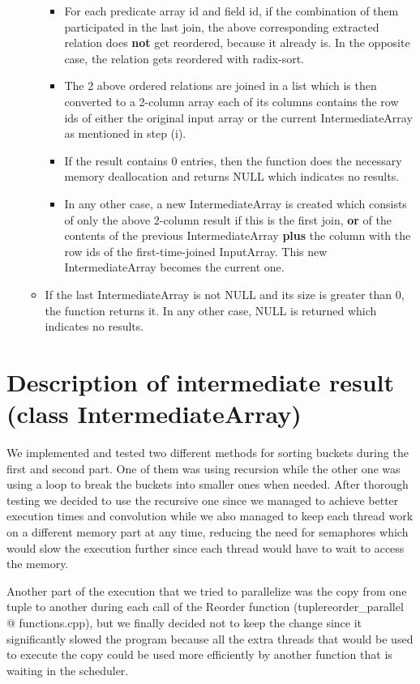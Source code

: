 \documentclass{ws-ijprai}
\begin{document}
\begin{itemize}
\begin{itemize}
\begin{itemize}
            \item For each predicate array id and field id, if the combination of them participated in the last join, the above corresponding extracted relation does \textbf{not} get reordered, because it already is. In the opposite case, the relation gets reordered with radix-sort.
            \item The 2 above ordered relations are joined in a list which is then converted to a 2-column array each of its columns contains the row ids of either the original input array or the current IntermediateArray as mentioned in step (i).
            \item If the result contains 0 entries, then the function does the necessary memory deallocation and returns NULL which indicates no results.
            \item In any other case, a new IntermediateArray is created which consists of only the above 2-column result if this is the first join, \textbf{or} of the contents of the previous IntermediateArray \textbf{plus} the column with the row ids of the first-time-joined InputArray. This new IntermediateArray becomes the current one.
        \end{itemize}
        \item If the last IntermediateArray is not NULL and its size is greater than 0, the function returns it. In any other case, NULL is returned which indicates no results.
    \end{itemize}
\end{itemize}


\section{Description of intermediate result (class IntermediateArray)}

\tab We implemented and tested two different methods for sorting buckets during the first and second part. One of them was using recursion while the other one was using a loop to break the buckets into smaller ones when needed. After thorough testing we decided to use the recursive one since we managed to achieve better execution times and convolution while we also managed to keep each thread work on a different memory part at any time, reducing the need for semaphores which would slow the execution further since each thread would have to wait to access the memory.

\tab Another part of the execution that we tried to parallelize was the copy from one tuple to another during each call of the Reorder function (tuplereorder\_parallel @ functions.cpp), but we finally decided not to keep the change since it significantly slowed the program because all the extra threads that would be used to execute the copy could be used more efficiently by another function that is waiting in the scheduler.
\end{document}
